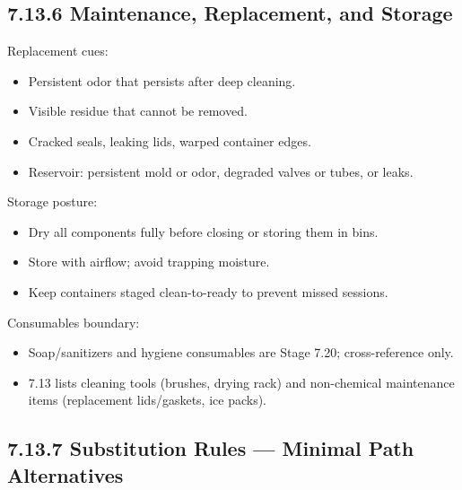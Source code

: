 \documentclass[10pt]{article}
\begin{document}
\subsection*{7.13.6 Maintenance, Replacement, and Storage}
{}

Replacement cues:

\begin{itemize}
\item Persistent odor that persists after deep cleaning.
\item Visible residue that cannot be removed.
\item Cracked seals, leaking lids, warped container edges.
\item Reservoir: persistent mold or odor, degraded valves or tubes, or leaks.
\end{itemize}

Storage posture:

\begin{itemize}
\item Dry all components fully before closing or storing them in bins.
\item Store with airflow; avoid trapping moisture.
\item Keep containers staged clean-to-ready to prevent missed sessions.
\end{itemize}

Consumables boundary:

\begin{itemize}
\item Soap/sanitizers and hygiene consumables are Stage 7.20; cross-reference only.
\item 7.13 lists cleaning tools (brushes, drying rack) and non-chemical maintenance items (replacement lids/gaskets, ice packs).
\end{itemize}

\subsection*{7.13.7 Substitution Rules — Minimal Path Alternatives}
{}
\end{document}
